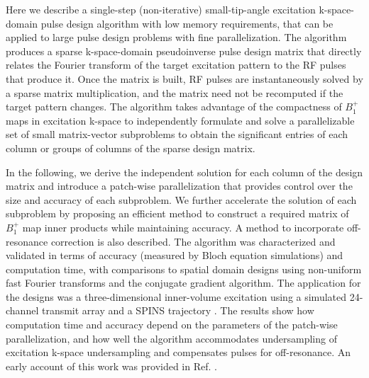 \par Here we describe a single-step (non-iterative) small-tip-angle excitation k-space-domain 
pulse design algorithm with low memory requirements, 
that can be applied to large pulse design problems with fine parallelization. 
The algorithm produces a sparse k-space-domain pseudoinverse pulse design matrix 
that directly relates the Fourier transform of the target excitation pattern to the RF pulses that produce it.
Once the matrix is built, 
RF pulses are instantaneously solved by a sparse matrix multiplication,
and the matrix need not be recomputed if the target pattern changes.
The algorithm takes advantage of the compactness of $B_1^+$ maps in excitation k-space
to independently formulate and solve a parallelizable set of small matrix-vector subproblems 
to obtain the significant entries of each column or groups of columns of the sparse design matrix.  

\par In the following, 
we derive the independent solution for each column of the design matrix 
and introduce a patch-wise parallelization that provides control over the size and accuracy of each subproblem. 
We further accelerate the solution of each subproblem by proposing an efficient method to construct a required
matrix of $B_1^+$ map inner products while maintaining accuracy. 
A method to incorporate off-resonance correction is also described. 
The algorithm was characterized and validated in terms of accuracy (measured by Bloch equation simulations) 
and computation time, with comparisons to spatial domain designs using 
non-uniform fast Fourier transforms and the conjugate gradient algorithm.
The application for the designs was a three-dimensional inner-volume excitation using a simulated 24-channel transmit array
and a SPINS trajectory \cite{malik2012tailored}.
The results show how computation time and accuracy depend on the parameters of the patch-wise parallelization,
and how well the algorithm accommodates undersampling of excitation k-space undersampling and compensates pulses for off-resonance.
An early account of this work was provided in Ref. \cite{grissom:ismrm18}.

